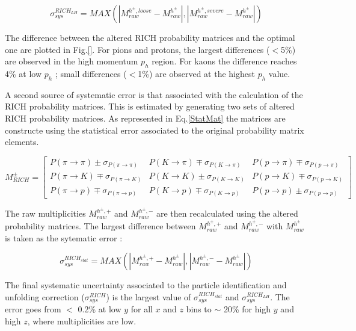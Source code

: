 \documentclass[letterpaper,12pt]{article}
\begin{document}
\begin{equation}
  \sigma^{RICH_{LH}}_{sys} = MAX(|M^{h^{\pm},loose}_{raw}-M^{h^{\pm}}_{raw}|,|M^{h^{\pm},severe}_{raw}-M^{h^{\pm}}_{raw}|)
\end{equation}

The difference between the altered RICH probability matrices and the optimal one are plotted in Fig.\ref{}. For pions and protons, the largest differences
($<$5\%) are observed in the high momentum $p_h$ region. For kaons the difference reaches 4\% at low $p_h$ ; small differences ($<$1\%) are observed at the
highest $p_h$ value.

A second source of systematic error is that associated with the calculation of the RICH probability matrices. This is estimated by generating two sets of altered
RICH probability matrices. As represented in Eq.\ref{StatMat} the matrices are constructe using the statistical error associated to the original probability matrix elements.

\begin{equation}
  M^{\pm}_{RICH}
  =
  \begin{bmatrix}
  P(\pi \rightarrow \pi)\pm\sigma_{P(\pi \rightarrow \pi)} & P(K \rightarrow \pi)\mp\sigma_{P(K \rightarrow \pi)} & P(p \rightarrow \pi)\mp\sigma_{P(p \rightarrow \pi)}\\
  P(\pi \rightarrow K)\mp\sigma_{P(\pi \rightarrow K)} & P(K \rightarrow K)\pm\sigma_{P(K \rightarrow K)} & P(p \rightarrow K)\mp\sigma_{P(p \rightarrow K)} \\
  P(\pi \rightarrow p)\mp\sigma_{P(\pi \rightarrow p)} & P(K \rightarrow p)\mp\sigma_{P(K \rightarrow p)} & P(p \rightarrow p)\pm\sigma_{P(p \rightarrow p)}
  \end{bmatrix}
	\label{StatMat}
\end{equation}

The raw multiplicities $M^{h^{\pm},+}_{raw}$ and $M^{h^{\pm},-}_{raw}$ are then recalculated using the altered probability matrices. The largest difference between
$M^{h^{\pm},+}_{raw}$ and $M^{h^{\pm},-}_{raw}$ with $M^{h^{\pm}}_{raw}$ is taken as the sytematic error :

\begin{equation}
  \sigma^{RICH_{stat}}_{sys} = MAX(|M^{h^{\pm},+}_{raw}-M^{h^{\pm}}_{raw}|,|M^{h^{\pm},-}_{raw}-M^{h^{\pm}}_{raw}|)
\end{equation}

The final systematic uncertainty associated to the particle identification and unfolding correction ($\sigma^{RICH}_{sys}$) is the largest value of $\sigma^{RICH_{stat}}_{sys}$ and $\sigma^{RICH_{LH}}_{sys}$. The error goes from $<$ 0.2\% at low $y$ for all $x$ and $z$ bins to $\sim$ 20\% for high $y$ and high $z$, where multiplicities are low.
\end{document}
